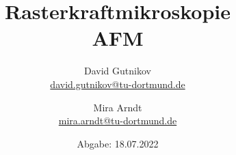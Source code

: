

\title{Rasterkraftmikroskopie\\
\small{AFM}}
\author{%
  David Gutnikov\\%
  \href{mailto:david.gutnikov@tu-dortmund.de}{david.gutnikov@tu-dortmund.de} \and
  Mira Arndt\\
  \href{mailto:mira.arndt@tu-dortmund.de}{mira.arndt@tu-dortmund.de}%
}
\date{
  Abgabe: 18.07.2022 %
}
\publishers{TU Dortmund – Fakultät Physik}
\makeatletter         
\def\@maketitle{
\raggedright
\texttt{[image: bilder/lo\_TU-Do\_2008/logo\_rgb\_jpg/tud\_logo\_rgb.jpg]}\\[8ex]
\begin{center}
{\Huge \bfseries \sffamily \@title }\\[4ex] 
{\Large  \@author}\\[4ex] 
\@date\\[8ex]
\publishers\\
\end{center}}
\makeatother





\maketitle
\thispagestyle{empty}
\tableofcontents
\newpage



 
 \newpage
 \nocite{*}
 \printbibliography

